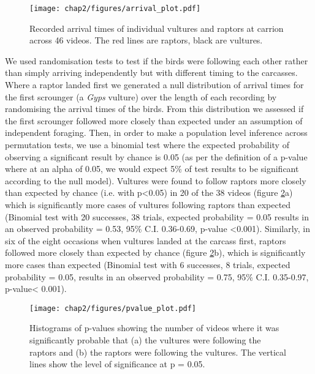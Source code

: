 
\begin{figure}[H] %
	  \centering
	  \texttt{[image: chap2/figures/arrival\_plot.pdf]}
	    \caption[Arrival times of vultures and raptors to carcasses] %
	    {Recorded arrival times of individual vultures and raptors at carrion across 46 videos. The red lines are raptors, black are vultures. }%
	  \label{fig:arrival_plot}
	\end{figure}
	

We used randomisation tests to test if the birds were following each other rather than simply arriving independently but with different timing to the carcasses. Where a raptor landed first we generated a null distribution of arrival times for the first scrounger (a \textit{Gyps} vulture) over the length of each recording by randomising the arrival times of the birds. From this distribution we assessed if the first scrounger followed more closely than expected under an assumption of independent foraging. Then, in order to make a population level inference across permutation tests, we use a binomial test where the expected probability of observing a significant result by chance is 0.05 (as per the definition of a p-value where at an alpha of 0.05, we would expect 5\% of test results to be significant according to the null model). Vultures were found to follow raptors more closely than expected by chance (i.e. with p<0.05) in 20 of the 38 videos (figure \ref{fig:pvalue_plot}a) which is significantly more cases  of vultures following raptors than expected (Binomial test with 20 successes, 38 trials, expected probability = 0.05 results in an observed probability = 0.53, 95\% C.I. 0.36-0.69, p-value <0.001).
Similarly, in six of the eight occasions when vultures landed at the carcass first, raptors followed more closely than expected by chance (figure \ref{fig:pvalue_plot}b), which is significantly more cases than expected (Binomial test with 6 successes, 8 trials, expected probability = 0.05, results in an observed probability = 0.75, 95\% C.I. 0.35-0.97, p-value< 0.001). 


\begin{figure}[H] %
	  \centering
	  \texttt{[image: chap2/figures/pvalue\_plot.pdf]}
	    \caption[Histogram plot of p-values] %
	    {Histograms of p-values showing the number of videos where it was significantly probable that (a) the vultures were following the raptors and (b) the raptors were following the vultures. The vertical lines show the level of significance at p = 0.05.}%
	  \label{fig:pvalue_plot}
	\end{figure}
	
